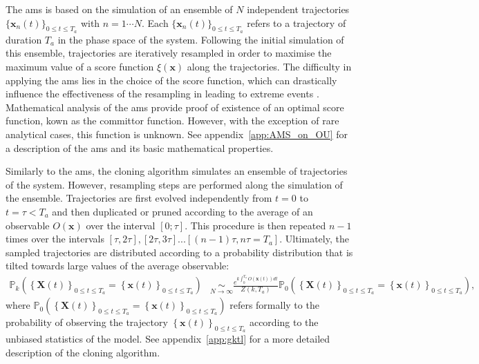 The \ac{ams} is based on the simulation of an ensemble of $N$ independent trajectories $\{\mathbf{x}_n(t)\}_{0\leq t \leq T_a}$ with $n=1 \cdots N$.
Each $\{\mathbf{x}_n(t)\}_{0\leq t \leq T_a}$ refers to a trajectory of duration $T_a$ in the phase space of the
system.
Following the initial simulation of this ensemble, trajectories are iteratively resampled in order to maximise the maximum value of a score function $\xi(\mathbf{x})$ along the trajectories.
The difficulty in applying the \ac{ams} lies in the choice of the score function, which can drastically
influence the effectiveness of the resampling in leading to extreme events \citep{rolland_statistical_2015}.
Mathematical analysis of the \ac{ams} provide proof of existence of an optimal score function, kown as the
committor function. However, with the exception of rare analytical cases, this function is unknown.
See appendix~\ref{app:AMS_on_OU} for a description of the \ac{ams} and its basic mathematical properties.

Similarly to the \ac{ams}, the cloning algorithm simulates an ensemble of trajectories of the system.
However, resampling steps are performed along the simulation of the ensemble.
Trajectories are first evolved independently from $t = 0$ to $t=\tau < T_a$ and then duplicated or pruned
according to the average of an observable $O(\mathbf{x})$ over the interval $[0;\tau]$.
This procedure is then repeated $n-1$ times over the intervals $[\tau, 2\tau], [2\tau, 3\tau]... [(n-1)\tau, n\tau = T_a]$.
Ultimately, the sampled trajectories are distributed according to a probability distribution that is tilted towards large values of the average observable:
\begin{align}
\mathbb{P}_{k}\left(\left\{ \mathbf{X}(t)\right\} _{0\leq t\leq T_{a}}=\left\{ \mathbf{x}(t)\right\} _{0\leq t\leq T_{a}}\right) &\underset{N\rightarrow\infty}{\sim} \frac{e^{k\int_{0}^{T_{a}}O(\mathbf{x}(t))dt}}{Z(k,T_a)}\mathbb{\mathbb{P}}_{0}\left(\left\{ \mathbf{X}(t)\right\} _{0\leq t\leq T_{a}}=\left\{ \mathbf{x}(t)\right\} _{0\leq t\leq T_{a}}\right),
\label{eq:Biased_Path_Approximation_main}
\end{align}
where
$\mathbb{P}_{0}\left(\left\{ \mathbf{X}(t)\right\} _{0\leq t\leq T_{a}} = \left\{ \mathbf{x}(t)\right\} _{0\leq t\leq T_{a}}\right)$ refers formally to the probability of observing the trajectory
$\left\{ \mathbf{x}(t)\right\} _{0\leq t\leq T_{a}}$ according to the unbiased statistics of the model.
See appendix~\ref{app:gktl} for a more detailed description of the cloning algorithm.

